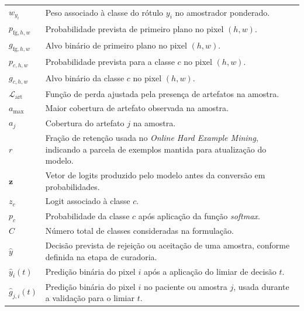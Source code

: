 \begin{longtable}{p{3.0cm}p{12.0cm}}
  $w_{y_i}$ &
  Peso associado à classe do rótulo $y_i$ no amostrador ponderado.\\

  $p_{\mathrm{fg},h,w}$ &
  Probabilidade prevista de primeiro plano no pixel $(h,w)$.\\

  $g_{\mathrm{fg},h,w}$ &
  Alvo binário de primeiro plano no pixel $(h,w)$.\\

  $p_{c,h,w}$ &
  Probabilidade prevista para a classe $c$ no pixel $(h,w)$.\\

  $g_{c,h,w}$ &
  Alvo binário da classe $c$ no pixel $(h,w)$.\\

  $\mathcal{L}_{\mathrm{art}}$ &
  Função de perda ajustada pela presença de artefatos na amostra.\\

  $a_{\max}$ &
  Maior cobertura de artefato observada na amostra.\\

  $a_j$ &
  Cobertura do artefato $j$ na amostra.\\

  $r$ &
  Fração de retenção usada no \textit{Online Hard Example Mining}, indicando a
  parcela de exemplos mantida para atualização do modelo.\\

  $\mathbf{z}$ &
  Vetor de logits produzido pelo modelo antes da conversão em probabilidades.\\

  $z_c$ &
  Logit associado à classe $c$.\\

  $p_c$ &
  Probabilidade da classe $c$ após aplicação da função \textit{softmax}.\\

  $C$ &
  Número total de classes consideradas na formulação.\\
  $\hat{y}$ &
  Decisão prevista de rejeição ou aceitação de uma amostra, conforme definida na
  etapa de curadoria.\\

  $\hat{y}_i(t)$ &
  Predição binária do pixel $i$ após a aplicação do limiar de decisão $t$.\\

  $\hat{g}_{j,i}(t)$ &
  Predição binária do pixel $i$ no paciente ou amostra $j$, usada durante a
  validação para o limiar $t$.\\


\end{longtable}
